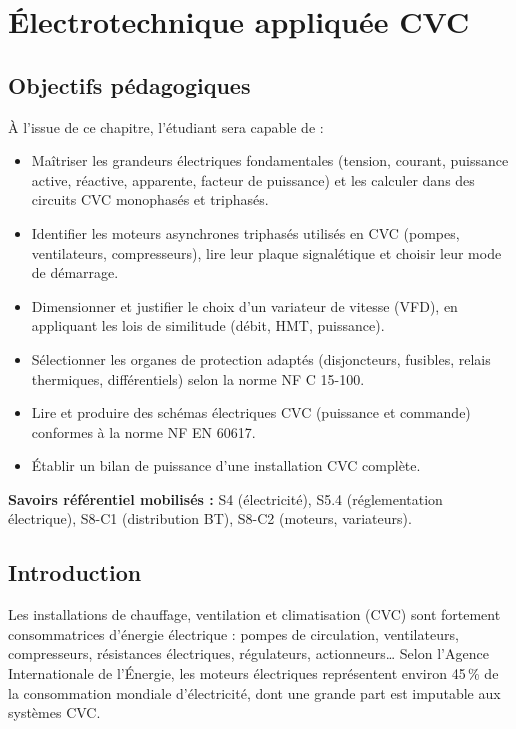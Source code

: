 \chapter{Électrotechnique appliquée CVC}

\section{Objectifs pédagogiques}

À l'issue de ce chapitre, l'étudiant sera capable de :
\begin{itemize}
  \item Maîtriser les grandeurs électriques fondamentales (tension, courant, puissance active, réactive, apparente, facteur de puissance) et les calculer dans des circuits CVC monophasés et triphasés.
  \item Identifier les moteurs asynchrones triphasés utilisés en CVC (pompes, ventilateurs, compresseurs), lire leur plaque signalétique et choisir leur mode de démarrage.
  \item Dimensionner et justifier le choix d'un variateur de vitesse (VFD), en appliquant les lois de similitude (débit, HMT, puissance).
  \item Sélectionner les organes de protection adaptés (disjoncteurs, fusibles, relais thermiques, différentiels) selon la norme NF C 15-100.
  \item Lire et produire des schémas électriques CVC (puissance et commande) conformes à la norme NF EN 60617.
  \item Établir un bilan de puissance d'une installation CVC complète.
\end{itemize}

\textbf{Savoirs référentiel mobilisés :} S4 (électricité), S5.4 (réglementation électrique), S8-C1 (distribution BT), S8-C2 (moteurs, variateurs).

\section{Introduction}

Les installations de chauffage, ventilation et climatisation (CVC) sont fortement consommatrices d'énergie électrique : pompes de circulation, ventilateurs, compresseurs, résistances électriques, régulateurs, actionneurs\dots{} Selon l'Agence Internationale de l'Énergie, les moteurs électriques représentent environ 45\,\% de la consommation mondiale d'électricité, dont une grande part est imputable aux systèmes CVC.


